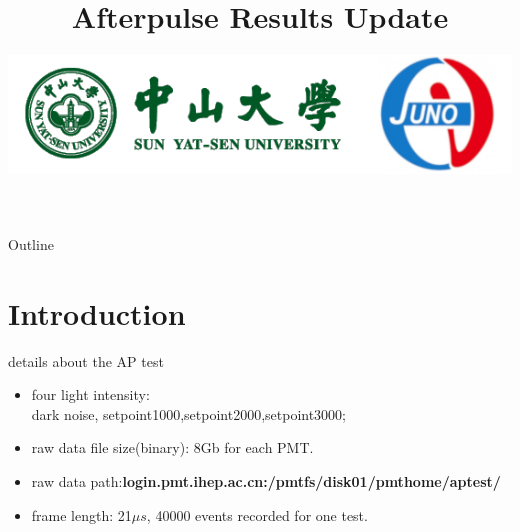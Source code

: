 \documentclass[11pt,compress,xcolor=x11names,UTF8]{beamer}
\title{Afterpulse Results Update}
\author[Yu Chen&& Rong Zhao ]{Email：zhaor25@mail2.sysu.edu.cn \and  } %
\institute[SYSU]{School of Physics\and } %
\date[\today]{\includegraphics[width=.5\textwidth]{logo}}
\begin{document}
\maketitle

\begin{frame}{Outline}
\tableofcontents
\end{frame}

\section{Introduction}

 \begin{frame}{details about the AP test}
\begin{itemize}
       \item  four light intensity:\\dark noise, setpoint1000,setpoint2000,setpoint3000;
       \item raw data file size(binary): 8Gb for each PMT.
       \item raw data path:\textbf{login.pmt.ihep.ac.cn:/pmtfs/disk01/pmthome/aptest/}
	\item frame length: 21$\mu s$, 40000 events recorded for one test. 
\end{itemize}
 \end{frame}
\end{document}
